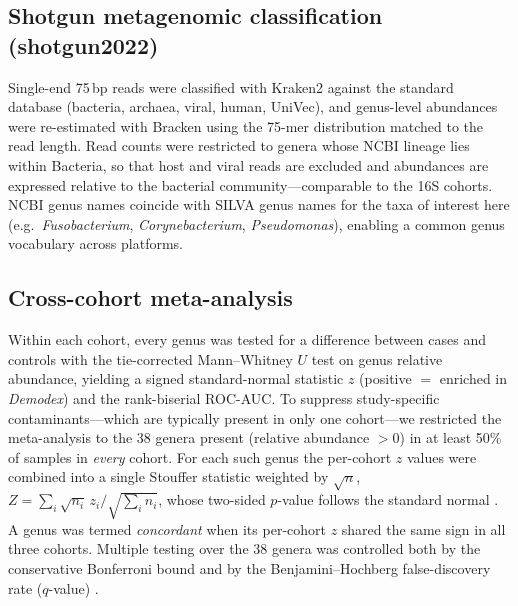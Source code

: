\documentclass[11pt]{article}
\newcommand{\demodex}{\textit{Demodex}}
\begin{document}
\subsection{Shotgun metagenomic classification (shotgun2022)}
Single-end 75\,bp reads were classified with Kraken2 \citep{kraken2} against the
standard database (bacteria, archaea, viral, human, UniVec), and genus-level
abundances were re-estimated with Bracken \citep{bracken} using the 75-mer
distribution matched to the read length. Read counts were restricted to genera
whose NCBI lineage lies within Bacteria, so that host and viral reads are excluded
and abundances are expressed relative to the bacterial community---comparable to
the 16S cohorts. NCBI genus names coincide with SILVA genus names for the taxa of
interest here (e.g.\ \textit{Fusobacterium}, \textit{Corynebacterium},
\textit{Pseudomonas}), enabling a common genus vocabulary across platforms.

\subsection{Cross-cohort meta-analysis}
Within each cohort, every genus was tested for a difference between cases and
controls with the tie-corrected Mann--Whitney $U$ test on genus relative
abundance, yielding a signed standard-normal statistic $z$ (positive $=$ enriched
in \demodex{}) and the rank-biserial ROC-AUC. To suppress study-specific
contaminants---which are typically present in only one cohort---we restricted the
meta-analysis to the 38 genera present (relative abundance $>0$) in at least
50\% of samples in \emph{every} cohort. For each such genus the per-cohort $z$
values were combined into a single Stouffer statistic weighted by $\sqrt{n}$,
$Z=\sum_i \sqrt{n_i}\,z_i \big/ \sqrt{\sum_i n_i}$, whose two-sided $p$-value
follows the standard normal \citep{whitlock2005}. A genus was termed
\emph{concordant} when its per-cohort $z$ shared the same sign in all three
cohorts. Multiple testing over the 38 genera was controlled both by the
conservative Bonferroni bound and by the Benjamini--Hochberg false-discovery rate
($q$-value) \citep{bh1995}.
\end{document}

